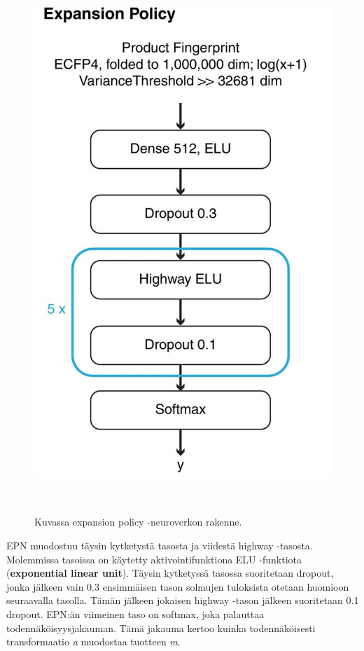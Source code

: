 \documentclass[finnish,twoside,censored,tkt,sw-line]{HYthesisML}
\begin{document}
\begin{figure}
    \centering
    \includegraphics[]{expansion-policy.jpg}
    \caption{Kuvassa expansion policy -neuroverkon rakenne.}
    {~\cite{SeglerMarwinHS2018Pcsw}}
\end{figure}

EPN muodostuu täysin kytketystä tasosta ja viidestä highway -tasosta.
Molemmissa tasoissa on käytetty aktivointifunktiona ELU -funktiota (\textbf{exponential linear unit}).
Täysin kytketyssä tasossa suoritetaan dropout, jonka jälkeen vain 0.3 ensimmäisen tason solmujen tuloksista otetaan huomioon seuraavalla tasolla.
Tämän jälkeen jokaisen highway -tason jälkeen suoritetaan 0.1 dropout.
EPN:än viimeinen taso on softmax, joka palauttaa todennäköisyysjakauman.
Tämä jakauma kertoo kuinka todennäköisesti transformaatio \emph{a} muodostaa tuotteen \emph{m}.
\end{document}
